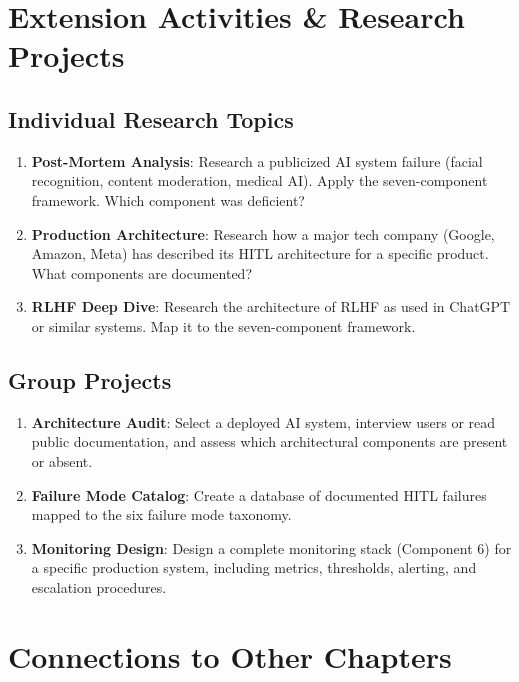 \section{Extension Activities \& Research Projects}

\subsection{Individual Research Topics}
\begin{enumerate}
    \item \textbf{Post-Mortem Analysis}: Research a publicized AI system failure (facial recognition, content moderation, medical AI). Apply the seven-component framework. Which component was deficient?
    \item \textbf{Production Architecture}: Research how a major tech company (Google, Amazon, Meta) has described its HITL architecture for a specific product. What components are documented?
    \item \textbf{RLHF Deep Dive}: Research the architecture of RLHF as used in ChatGPT or similar systems. Map it to the seven-component framework.
\end{enumerate}

\subsection{Group Projects}
\begin{enumerate}
    \item \textbf{Architecture Audit}: Select a deployed AI system, interview users or read public documentation, and assess which architectural components are present or absent.
    \item \textbf{Failure Mode Catalog}: Create a database of documented HITL failures mapped to the six failure mode taxonomy.
    \item \textbf{Monitoring Design}: Design a complete monitoring stack (Component 6) for a specific production system, including metrics, thresholds, alerting, and escalation procedures.
\end{enumerate}

\section{Connections to Other Chapters}

